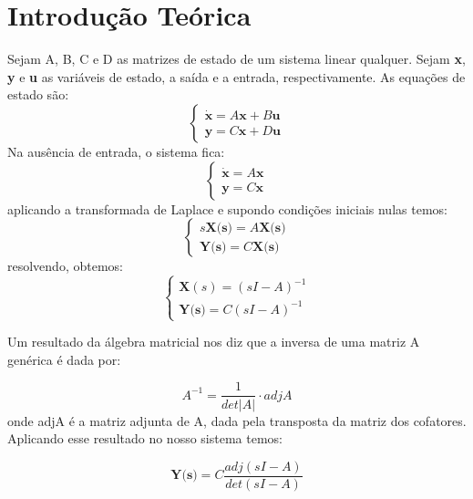 \documentclass[journal]{IEEEtran}
\begin{document}
\section{Introdução Teórica}
Sejam A, B, C e D as matrizes de estado de um sistema linear
qualquer.
Sejam \textbf{x}, \textbf{y} e \textbf{u} as variáveis de estado, a 
saída e a entrada, respectivamente.
As equações de estado são:
\begin{equation}
\left\{
\begin{array}{l}
\dot{\textbf{x}} = A\textbf{x} + B\textbf{u} \\
\textbf{y} = C\textbf{x} + D\textbf{u}
\end{array}
\right.
\end{equation}
Na ausência de entrada, o sistema fica:
\begin{equation}
\left\{
\begin{array}{l}
\dot{\textbf{x}} = A\textbf{x}  \\
\textbf{y} = C\textbf{x} 
\end{array}
\right.
\end{equation}
aplicando a transformada de Laplace e supondo condições iniciais
nulas temos:
\begin{equation}
\left\{
\begin{array}{l}
s\textbf{X(s)} = A\textbf{X(s)}  \\
\textbf{Y(s)} = C\textbf{X(s)} 
\end{array}
\right.
\end{equation}
resolvendo, obtemos:
\begin{equation}
\left\{
\begin{array}{l}
\textbf{X}(s) = (sI - A)^{-1} \\
\textbf{Y(s)} = C(sI - A)^{-1} 
\end{array}
\right.
\end{equation}

Um resultado da álgebra matricial nos diz que a inversa de uma matriz
A genérica é dada por:

\begin{equation}
 A^{-1} = \frac{1}{det|A|} \cdot adjA
\end{equation}
onde adjA é a matriz adjunta de A, dada pela transposta da matriz dos 
cofatores. Aplicando esse resultado no nosso sistema temos:

\begin{equation}
\textbf{Y(s)} = C\frac{adj(sI - A)}{det(sI - A)} 
\end{equation}
\end{document}
